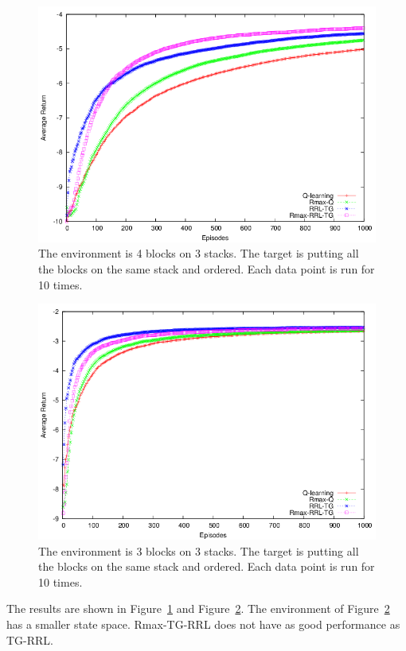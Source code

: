 \documentclass[10pt]{article}
\begin{document}
\begin{figure}
\centering
\includegraphics[width=1\columnwidth]{figure1.png}
\caption{The environment is 4 blocks on 3 stacks. The target is putting all the
blocks on the same stack and ordered. Each data point is run for 10 times.}
\label{fig:exp1}
\end{figure}

\begin{figure}
\centering
\includegraphics[width=1\columnwidth]{figure2.png}
\caption{The environment is 3 blocks on 3 stacks. The target is putting all the
blocks on the same stack and ordered. Each data point is run for 10 times.}
\label{fig:exp2}
\end{figure}

The results are shown in Figure~\ref{fig:exp1} and Figure~\ref{fig:exp2}.
The environment of Figure~\ref{fig:exp2} has a smaller state space. Rmax-TG-RRL
does not have as good performance as TG-RRL.
\end{document}
